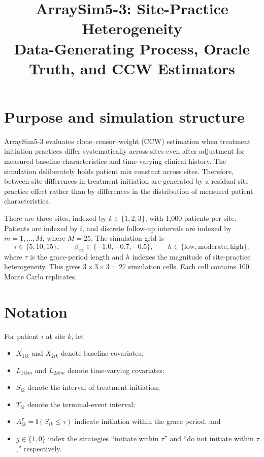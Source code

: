\documentclass[11pt]{article}
\title{ArraySim5-3: Site-Practice Heterogeneity\\
Data-Generating Process, Oracle Truth, and CCW Estimators}
\author{}
\date{}
\newcommand{\ind}{\mathbb{I}}
\begin{document}
\maketitle

\section{Purpose and simulation structure}

ArraySim5-3 evaluates clone--censor--weight (CCW) estimation when treatment
initiation practices differ systematically across sites even after adjustment
for measured baseline characteristics and time-varying clinical history. The
simulation deliberately holds patient mix constant across sites. Therefore,
between-site differences in treatment initiation are generated by a residual
site-practice effect rather than by differences in the distribution of
measured patient characteristics.

There are three sites, indexed by $k\in\{1,2,3\}$, with 1,000 patients per
site. Patients are indexed by $i$, and discrete follow-up intervals are
indexed by $m=1,\ldots,M$, where $M=25$. The simulation grid is
\[
  \tau\in\{5,10,15\},\qquad
  \beta_{\mathrm{trt}}\in\{-1.0,-0.7,-0.5\},\qquad
  h\in\{\text{low},\text{moderate},\text{high}\},
\]
where $\tau$ is the grace-period length and $h$ indexes the magnitude of
site-practice heterogeneity. This gives $3\times3\times3=27$ simulation
cells. Each cell contains 100 Monte Carlo replicates.

\section{Notation}

For patient $i$ at site $k$, let
\begin{itemize}[leftmargin=2em]
  \item $X_{1ik}$ and $X_{2ik}$ denote baseline covariates;
  \item $L_{1ikm}$ and $L_{2ikm}$ denote time-varying covariates;
  \item $S_{ik}$ denote the interval of treatment initiation;
  \item $T_{ik}$ denote the terminal-event interval;
  \item $A_{ik}^{\tau}=\ind(S_{ik}\leq\tau)$ indicate initiation within the
        grace period; and
  \item $g\in\{1,0\}$ index the strategies ``initiate within $\tau$'' and
        ``do not initiate within $\tau$,'' respectively.
\end{itemize}
\end{document}

